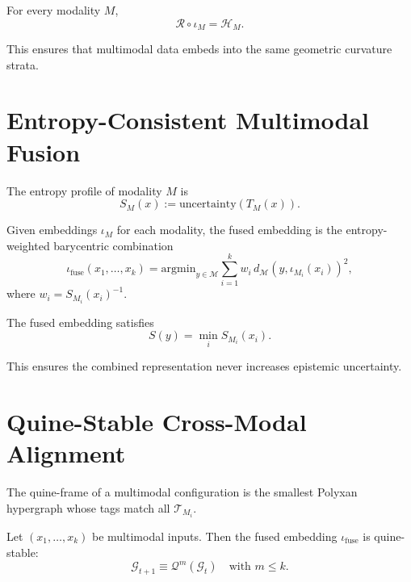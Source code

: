 \begin{theorem}
For every modality $M$,
\[
\mathcal{R} \circ \iota_M = \mathcal{H}_M.
\]
\end{theorem}

This ensures that multimodal data embeds into the same geometric curvature
strata.

\section{Entropy-Consistent Multimodal Fusion}
\label{sec:59:entropy}

\begin{definition}
The entropy profile of modality $M$ is
\[
S_M(x) := \mathrm{uncertainty}(T_M(x)).
\]
\end{definition}

\begin{definition}
Given embeddings $\iota_M$ for each modality,
the fused embedding is the entropy-weighted barycentric combination
\[
\iota_{\mathrm{fuse}}(x_1,\dots,x_k)
= \mathrm{argmin}_{y\in\mathcal{M}}
  \sum_{i=1}^k w_i\, d_{\mathcal{M}}(y,\iota_{M_i}(x_i))^2,
\]
where $w_i = S_{M_i}(x_i)^{-1}$.
\end{definition}

\begin{theorem}
The fused embedding satisfies
\[
S(y) = \min_i S_{M_i}(x_i).
\]
\end{theorem}

This ensures the combined representation never increases epistemic uncertainty.

\section{Quine-Stable Cross-Modal Alignment}
\label{sec:59:quine}

\begin{definition}
The quine-frame of a multimodal configuration is the smallest Polyxan
hypergraph whose tags match all $\mathcal{T}_{M_i}$.
\end{definition}

\begin{theorem}
Let $(x_1,\ldots,x_k)$ be multimodal inputs.  
Then the fused embedding $\iota_{\mathrm{fuse}}$ is quine-stable:
\[
\mathcal{G}_{t+1} 
\equiv \mathcal{Q}^m(\mathcal{G}_t)
\quad\text{with } m\le k.
\]
\end{theorem}

